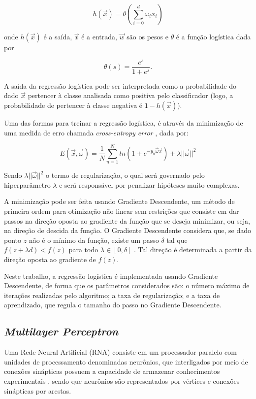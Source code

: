 \documentclass[12pt,a4paper,utf8]{ppgsi}
\begin{document}
\begin{dmath*} \label{eq:reglog}
    h(\vec{x}) = \theta \left( \sum^d_{i=0}{\omega_i x_i} \right)
\end{dmath*}

\noindent onde $h(\vec{x})$ é a saída, $\vec{x}$ é a entrada, $\vec{w}$ são os pesos e $\theta$ é a função logística dada por

\begin{dmath*} \label{eq:theta}
    \theta(s) = \frac{e^s}{1+e^s}.
\end{dmath*}

A saída da regressão logística pode ser interpretada como a probabilidade do dado $\vec{x}$ pertencer à classe analisada como positiva pelo classificador (logo, a probabilidade de pertencer à classe negativa é $1-h(\vec{x})$).

Uma das formas para treinar a regressão logística, é através da minimização de uma medida de erro chamada \textit{cross-entropy error} \citep{Caltech2012}, dada por:

\begin{dmath*} \label{eq:error}
    E(\vec{x}, \vec{\omega}) = \frac{1}{N} \sum^N_{n=1}ln(1+e^{-y_n\vec{\omega}\vec{x}}) + \lambda||\vec{\omega}||^2
\end{dmath*}

Sendo $\lambda||\vec{\omega}||^2$ o termo de regularização, o qual será governado pelo hiperparâmetro $\lambda$ e será responsável por penalizar hipóteses muito complexas.

A minimização pode ser feita usando Gradiente Descendente, um método de primeira ordem para otimização não linear sem restrições que consiste em dar passos na direção oposta ao gradiente da função que se deseja minimizar, ou seja, na direção de descida da função. O Gradiente Descendente considera que, se dado ponto $z$ não é o mínimo da função, existe um passo $\delta$ tal que $f(z+\lambda d) < f(z)$ para todo $\lambda \in [0, \delta]$ \cite{Bazaraa2006}. Tal direção é determinada a partir da direção oposta ao gradiente de $f(z)$.

Neste trabalho, a regressão logística é implementada usando Gradiente Descendente, de forma que os parâmetros considerados são: o número máximo de iterações realizadas pelo algoritmo; a taxa de regularização; e a taxa de aprendizado, que regula o tamanho do passo no Gradiente Descendente.



\subsection{\textit{Multilayer Perceptron}} \label{sec:mlp}
Uma Rede Neural Artificial (RNA) consiste em um processador paralelo com unidades de processamento denominadas neurônios, que interligados por meio de conexões sinápticas possuem a capacidade de armazenar conhecimentos experimentais \citep{haykin2009neural}, sendo que neurônios são representados por vértices e conexões sinápticas por arestas.
\end{document}
